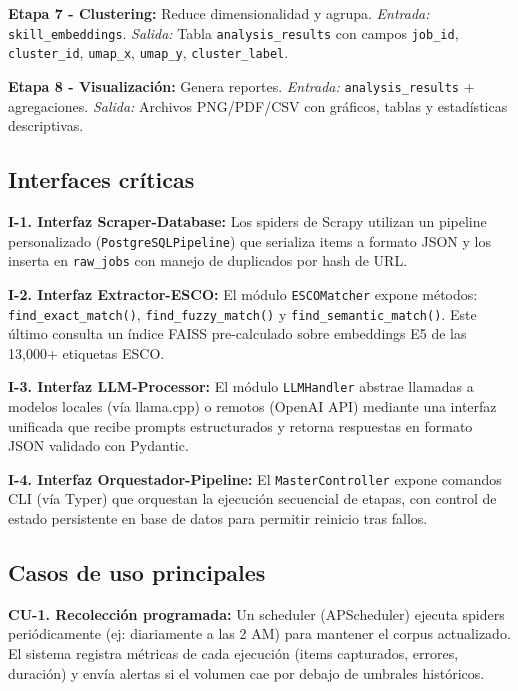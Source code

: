 \textbf{Etapa 7 - Clustering:} Reduce dimensionalidad y agrupa. \textit{Entrada:} \texttt{skill\_embeddings}. \textit{Salida:} Tabla \texttt{analysis\_\allowbreak results} con campos \texttt{job\_id}, \texttt{cluster\_id}, \texttt{umap\_x}, \texttt{umap\_y}, \texttt{cluster\_\allowbreak label}.

\textbf{Etapa 8 - Visualización:} Genera reportes. \textit{Entrada:} \texttt{analysis\_results} + agregaciones. \textit{Salida:} Archivos PNG/PDF/CSV con gráficos, tablas y estadísticas descriptivas.

\subsection{Interfaces críticas}

\textbf{I-1. Interfaz Scraper-Database:} Los spiders de Scrapy utilizan un pipeline personalizado (\texttt{PostgreSQL\-Pipeline}) que serializa items a formato JSON y los inserta en \texttt{raw\_jobs} con manejo de duplicados por hash de URL.

\textbf{I-2. Interfaz Extractor-ESCO:} El módulo \texttt{ESCOMatcher} expone métodos: \texttt{find\_exact\_match()}, \texttt{find\_fuzzy\_match()} y \linebreak
\texttt{find\_semantic\_match()}. Este último consulta un índice FAISS pre-calculado sobre embeddings E5 de las 13,000+ etiquetas ESCO.

\textbf{I-3. Interfaz LLM-Processor:} El módulo \texttt{LLMHandler} abstrae llamadas a modelos locales (vía llama.cpp) o remotos (OpenAI API) mediante una interfaz unificada que recibe prompts estructurados y retorna respuestas en formato JSON validado con Pydantic.

\textbf{I-4. Interfaz Orquestador-Pipeline:} El \texttt{MasterController} expone comandos CLI (vía Typer) que orquestan la ejecución secuencial de etapas, con control de estado persistente en base de datos para permitir reinicio tras fallos.

\subsection{Casos de uso principales}

\textbf{CU-1. Recolección programada:} Un scheduler (APScheduler) ejecuta spiders periódicamente (ej: diariamente a las 2 AM) para mantener el corpus actualizado. El sistema registra métricas de cada ejecución (items capturados, errores, duración) y envía alertas si el volumen cae por debajo de umbrales históricos.

